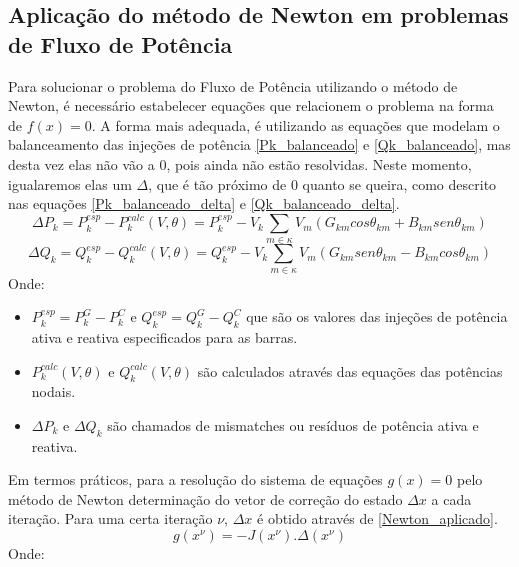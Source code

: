 \subsection{Aplicação do método de Newton em problemas de Fluxo de Potência}
Para solucionar o problema do Fluxo de Potência utilizando o método de Newton, é necessário estabelecer equações que relacionem o problema na forma de $f(x)=0$. A forma mais adequada, é utilizando as equações que modelam o balanceamento das injeções de potência \ref{Pk_balanceado} e \ref{Qk_balanceado}, mas desta vez elas não vão a $0$, pois ainda não estão resolvidas. Neste momento, igualaremos elas um $\Delta$, que é tão próximo de $0$ quanto se queira, como descrito nas equações \ref{Pk_balanceado_delta} e \ref{Qk_balanceado_delta}.\\
\begin{equation}
    \Delta P_k = P^{esp}_k - P^{calc}_k(V,\theta)= P^{esp}_k - V_k \sum_{m\in \kappa} V_m (G_{km} cos\theta_{km} + B_{km}sen\theta_{km})
    \label{Pk_balanceado_delta}
\end{equation}
\begin{equation}
    \Delta Q_k = Q^{esp}_k - Q^{calc}_k(V,\theta) = Q^{esp}_k - V_k \sum_{m\in \kappa} V_m (G_{km} sen\theta_{km} - B_{km}cos\theta_{km})
    \label{Qk_balanceado_delta}
\end{equation}
Onde:
\begin{itemize}
    
    \item $P^{esp}_k = P^G_k -P^C_k$ e $Q^{esp}_k = Q^G_k -Q^C_k$ que são os valores das injeções de potência ativa e reativa especificados para as barras.
    \item $P^{calc}_k(V,\theta)$ e $Q^{calc}_k(V,\theta)$ são calculados através das equações das potências nodais.
    \item $\Delta P_k$ e $\Delta Q_k$ são chamados de mismatches ou resíduos de potência ativa e reativa. 

\end{itemize}
Em termos práticos, para a resolução do sistema de equações $g(x) = 0$ pelo método de Newton determinação do vetor de correção do estado $\Delta x$ a cada iteração. Para uma certa iteração  $\nu$, $\Delta x$ é obtido através de \ref{Newton_aplicado}.\\
\begin{equation}
    g(x^\nu) = -J(x^\nu) . \Delta (x^\nu)
    \label{Newton_aplicado}
\end{equation}
Onde:\\
